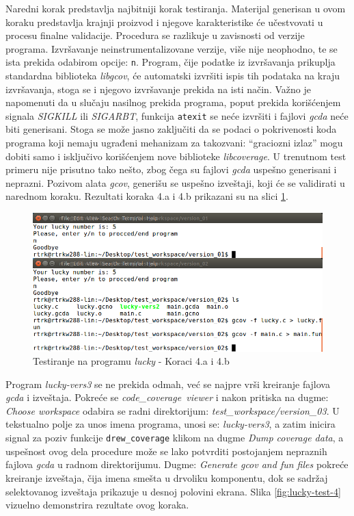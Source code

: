 \documentclass[12pt,oneside]{memoir}
\newcommand{\kod}[1]{\texttt{#1}}
\newcommand{\strano}[1]{\textit{#1}}
\begin{document}
Naredni korak predstavlja najbitniji korak testiranja. Materijal generisan u ovom koraku predstavlja krajnji proizvod i njegove karakteristike će učestvovati u procesu finalne validacije. Procedura se razlikuje u zavisnosti od verzije programa. Izvršavanje neinstrumentalizovane verzije, više nije neophodno, te se ista prekida odabirom opcije: \kod{n}. Program, čije podatke iz izvršavanja prikuplja standardna biblioteka \strano{libgcov}, će automatski izvršiti ispis tih podataka na kraju izvršavanja, stoga se i njegovo izvršavanje prekida na isti način. Važno je napomenuti da u slučaju nasilnog prekida programa, poput prekida korišćenjem signala \strano{SIGKILL} ili \strano{SIGARBT}, funkcija \kod{atexit} se neće izvršiti i fajlovi \strano{gcda} neće biti generisani. Stoga se može jasno zaključiti da se podaci o pokrivenosti koda programa koji nemaju ugrađeni mehanizam za takozvani: “graciozni izlaz” mogu dobiti samo i isključivo korišćenjem nove biblioteke \strano{libcoverage}. U trenutnom test primeru nije prisutno tako nešto, zbog čega su fajlovi \strano{gcda} uspešno generisani i neprazni. Pozivom alata \strano{gcov}, generišu se uspešno izveštaji, koji će se validirati u narednom koraku. Rezultati koraka 4.a i 4.b prikazani su na slici \ref{fig:lucky-test-3}.

\begin{figure}[!ht]
  \centering
  \includegraphics[width=\textwidth]{img/lucky3-ng.png}
  \caption{Testiranje na programu \strano{lucky} - Koraci 4.a i 4.b}
  \label{fig:lucky-test-3}
\end{figure}

Program \strano{lucky-vers3} se ne prekida odmah, već se najpre vrši kreiranje fajlova \strano{gcda} i izveštaja. Pokreće se \strano{code\_coverage\ viewer} i nakon pritiska na dugme: \strano{Choose workspace} odabira se radni direktorijum: \strano{test\_workspace/version\_03}. U tekstualno polje za unos imena programa, unosi se: \strano{lucky-vers3}, a zatim inicira signal za poziv funkcije \kod{drew\_coverage} klikom na dugme \strano{Dump coverage data}, a uspešnost ovog dela procedure može se lako potvrditi postojanjem nepraznih fajlova \strano{gcda} u radnom direktorijumu. Dugme: \strano{Generate gcov and fun files} pokreće kreiranje izveštaja, čija imena smešta u drvoliku komponentu, dok se sadržaj selektovanog izveštaja prikazuje u desnoj polovini ekrana. Slika \ref{fig:lucky-test-4} vizuelno demonstrira rezultate ovog koraka.
\end{document}
